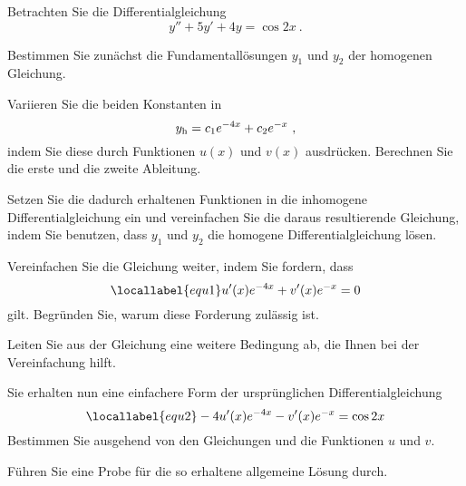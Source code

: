 \begin{atiTask}[
  title = Die Variation der Konstanten
]
  Betrachten Sie die Differentialgleichung
  \[
    y'' + 5y' + 4y = \cos 2x \ .
  \]
  \begin{atiSubtasks}
    \item{
      Bestimmen Sie zunächst die Fundamentallösungen $y_1$ und $y_2$ der homogenen Gleichung.
    }
    \item{
      Variieren Sie die beiden Konstanten in
      \[
        y_{\mathrm{h}} = c_1e^{-4x} + c_2e^{-x} \ ,
      \]
      indem Sie diese durch Funktionen $u(x)$ und $v(x)$ ausdrücken.
      Berechnen Sie die erste und die zweite Ableitung.
    }
    \item{
      Setzen Sie die dadurch erhaltenen Funktionen in die inhomogene Differentialgleichung ein und vereinfachen Sie die daraus resultierende Gleichung, indem Sie benutzen, dass $y_1$ und $y_2$ die homogene Differentialgleichung lösen.
    }
    \item{
      Vereinfachen Sie die Gleichung weiter, indem Sie fordern, dass
      \begin{equation}
        \locallabel{equ1}
        u'(x)e^{-4x} + v'(x)e^{-x} = 0
      \end{equation}
      gilt.
      Begründen Sie, warum diese Forderung zulässig ist.
    }
    \item{
      Leiten Sie aus der Gleichung  eine weitere Bedingung ab, die Ihnen bei der Vereinfachung hilft.
    }
    \item{
      Sie erhalten nun eine einfachere Form der ursprünglichen Differentialgleichung
      \begin{equation}
        \locallabel{equ2}
        -4u'(x)e^{-4x} - v'(x)e^{-x} = \cos 2x
      \end{equation}
      Bestimmen Sie ausgehend von den Gleichungen  und  die Funktionen $u$ und $v$.
    }
    \item{
      Führen Sie eine Probe für die so erhaltene allgemeine Lösung durch.
    }
  \end{atiSubtasks}
\end{atiTask}